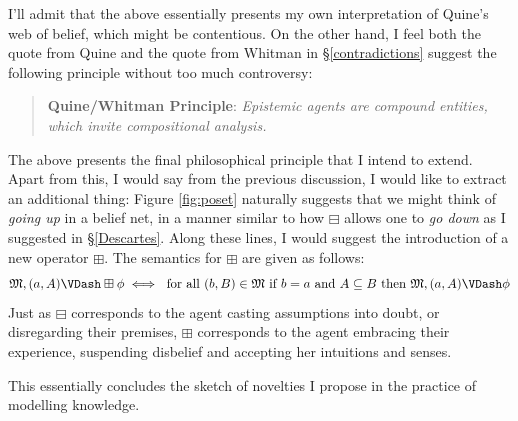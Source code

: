 \documentclass[11pt]{article}
\numberwithin{equation}{subsection}
\renewcommand{\Omega}{\mathfrak{M}}
\newcommand{\BM}{\boxminus}
\newcommand{\BP}{\boxplus}
\begin{document}
I'll admit that the above essentially presents my own interpretation
of Quine's web of belief, which might be contentious.  On the other
hand, I feel both the quote from Quine and the quote from Whitman in
\S\ref{contradictions} suggest the following principle without too
much controversy:
\begin{quote}
 \textbf{Quine/Whitman Principle}: \emph{Epistemic agents are compound
   entities, which invite compositional analysis.}
\end{quote}
The above presents the final philosophical principle that I intend to
extend.  Apart from this, I would say from the previous discussion, I
would like to extract an additional thing:  Figure \ref{fig:poset}
naturally suggests that we might think of \emph{going up} in a belief
net, in a manner similar to how $\BM$ allows one to \emph{go down} as
I suggested in \S\ref{Descartes}. Along these lines, I would suggest
the introduction of a new operator $\BP$.  The semantics for $\BP$ are
given as follows:
\[ \Omega,(a,A) \VDash \BP \phi \iff \textup{ for all } (b,B)\in\Omega\textup{ if } b = a \textup{ and } A\subseteq B \textup{ then } \Omega,(a,A) \VDash \phi \]
Just as $\BM$ corresponds to the agent casting assumptions into doubt,
or disregarding their premises, $\BP$ corresponds to the agent
embracing their experience, suspending disbelief and accepting her
intuitions and senses.

This essentially concludes the sketch of novelties I propose in the
practice of modelling knowledge.
\end{document}
